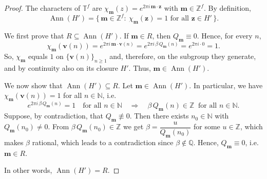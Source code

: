 \documentclass[11pt]{article}
\DeclareMathOperator{\Ann}{Ann}
\def\Z{{\mathbb  Z}}
\def\N{{\mathbb  N}}
\def \Z{{\mathbb Z}}
\def\Q{\mathbb{Q}}
\theoremstyle{definition}
\newcommand{\T}{\mathbb T}
\begin{document}
\begin{proof}
    The characters of $\T^f$ are $\chi_\mathbf{m}(z)=e^{2\pi i\,\mathbf{m}\cdot \mathbf{z}}$ with $\mathbf{m}\in\Z^f$.
By definition,
\[
\Ann(H')=\{\,\mathbf{m}\in\Z^f:\ \chi_\mathbf{m}(\mathbf{z})=1\text{ for all }\mathbf{z}\in H'\,\}.
\]

We first prove that $R\subseteq \Ann(H')$.
If $\mathbf{m}\in R$, then $Q_\mathbf{m}\equiv 0$. Hence, for every $n$,
\[
\chi_\mathbf{m}(\mathbf v(n))=e^{2\pi i\,\mathbf{m}\cdot \mathbf v(n)}
=e^{2\pi i\,\beta\,Q_\mathbf{m}(n)}=e^{2\pi i\cdot 0}=1.
\]
So, $\chi_\mathbf{m}$ equals $1$ on $\{\mathbf v(n)\}_{n\ge 1}$ and, therefore, on the subgroup they generate,
and by continuity also on its closure $H'$. Thus, $\mathbf{m}\in\Ann(H')$.

We now show that $\Ann(H')\subseteq R$.
Let $\mathbf{m}\in\Ann(H')$. In particular, we have $\chi_\mathbf{m}(\mathbf v(n))=1$ for all $n\in\N$, i.e.
\[
e^{2\pi i\,\beta\,Q_\mathbf{m}(n)}=1\quad\text{for all }n\in\N
\quad\Longrightarrow\quad \beta\,Q_\mathbf{m}(n)\in\Z\ \text{ for all }n\in\N.
\]
Suppose, by contradiction, that $Q_\mathbf{m}\not\equiv 0$. Then there exists $n_0\in\N$
with $Q_\mathbf{m}(n_0)\neq 0$. From $\beta\,Q_\mathbf{m}(n_0)\in\Z$ we get
\(
\beta = \dfrac{u}{Q_\mathbf{m}(n_0)}
\)
for some $u\in\Z$, which makes $\beta$ rational, which leads to a contradiction since
$\beta\notin\Q$. Hence, $Q_\mathbf{m}\equiv 0$, i.e. $\mathbf{m}\in R$.

In other words, $\Ann(H')=R$.
\end{proof}
\end{document}
